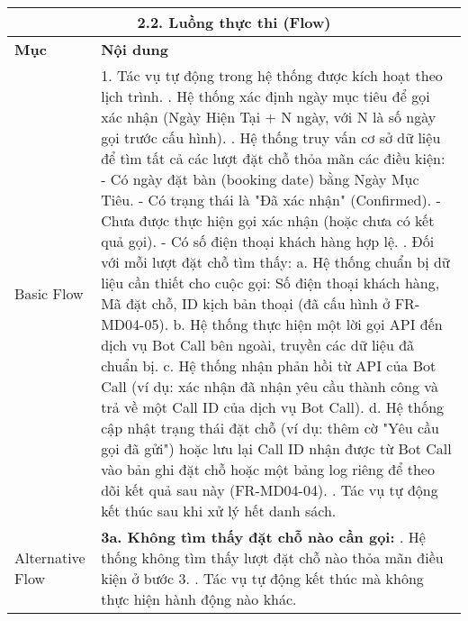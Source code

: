 \begin{longtable}{|m{4cm}|p{11cm}|}
\hline
\multicolumn{2}{|c|}{\textbf{2.2. Luồng thực thi (Flow)}} \\
\hline
\textbf{Mục} & \textbf{Nội dung} \\
\hline
Basic Flow & 1. Tác vụ tự động trong hệ thống được kích hoạt theo lịch trình. \newline 2. Hệ thống xác định ngày mục tiêu để gọi xác nhận (Ngày Hiện Tại + N ngày, với N là số ngày gọi trước cấu hình). \newline 3. Hệ thống truy vấn cơ sở dữ liệu để tìm tất cả các lượt đặt chỗ thỏa mãn các điều kiện: \newline    - Có ngày đặt bàn (booking date) bằng Ngày Mục Tiêu. \newline    - Có trạng thái là "Đã xác nhận" (Confirmed). \newline    - Chưa được thực hiện gọi xác nhận (hoặc chưa có kết quả gọi). \newline    - Có số điện thoại khách hàng hợp lệ. \newline 4. Đối với mỗi lượt đặt chỗ tìm thấy: \newline    a. Hệ thống chuẩn bị dữ liệu cần thiết cho cuộc gọi: Số điện thoại khách hàng, Mã đặt chỗ, ID kịch bản thoại (đã cấu hình ở FR-MD04-05). \newline    b. Hệ thống thực hiện một lời gọi API đến dịch vụ Bot Call bên ngoài, truyền các dữ liệu đã chuẩn bị. \newline    c. Hệ thống nhận phản hồi từ API của Bot Call (ví dụ: xác nhận đã nhận yêu cầu thành công và trả về một Call ID của dịch vụ Bot Call). \newline    d. Hệ thống cập nhật trạng thái đặt chỗ (ví dụ: thêm cờ "Yêu cầu gọi đã gửi") hoặc lưu lại Call ID nhận được từ Bot Call vào bản ghi đặt chỗ hoặc một bảng log riêng để theo dõi kết quả sau này (FR-MD04-04). \newline 5. Tác vụ tự động kết thúc sau khi xử lý hết danh sách. \\
\hline
Alternative Flow & \textbf{3a. Không tìm thấy đặt chỗ nào cần gọi:} \newline    1. Hệ thống không tìm thấy lượt đặt chỗ nào thỏa mãn điều kiện ở bước 3. \newline    2. Tác vụ tự động kết thúc mà không thực hiện hành động nào khác. \\
\hline

\end{longtable}
